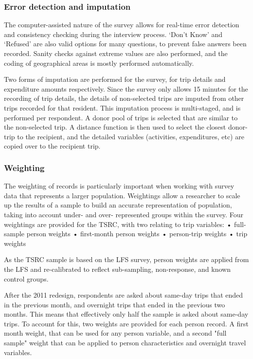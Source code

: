 \subsubsection{Error detection and imputation}
The computer-assisted nature of the survey allows for real-time error detection and consistency checking during the interview process. `Don’t Know’ and `Refused’ are also valid options for many questions, to prevent false answers been recorded. Sanity checks against extreme values are also performed, and the coding of geographical areas is mostly performed automatically.

Two forms of imputation are performed for the survey, for trip details and expenditure amounts respectively. Since the survey only allows 15 minutes for the recording of trip details, the details of non-selected trips are imputed from other trips recorded for that resident. This imputation process is multi-staged, and is performed per respondent. A donor pool of trips is selected that are similar to the non-selected trip. A distance function is then used to select the closest donor-trip to the recipient, and the detailed variables (activities, expenditures, etc) are copied over to the recipient trip.

\subsubsection{Weighting}
The weighting of records is particularly important when working with survey data that represents a larger population. Weightings allow a researcher to scale up the results of a sample to build an accurate representation of population, taking into account under- and over- represented groups within the survey. Four weightings are provided for the TSRC, with two relating to trip variables:
•	full-sample person weights
•	first-month person weights
•	person-trip weights
•	trip weights

As the TSRC sample is based on the LFS survey, person weights are applied from the LFS and re-calibrated to reflect sub-sampling, non-response, and known control groups. 

After the 2011 redesign, respondents are asked about same-day trips that ended in the previous month, and overnight trips that ended in the previous two months. This means that effectively only half the sample is asked about same-day trips. To account for this, two weights are provided for each person record. A first month weight, that can be used for any person variable, and a second "full sample" weight that can be applied to person characteristics and overnight travel variables.

